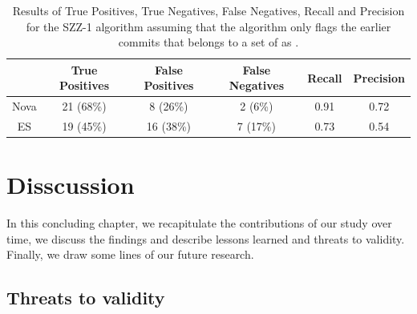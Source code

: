 \documentclass[a4paper, 12pt]{book}
\begin{document}
\begin{table}[!t]
	\renewcommand{\arraystretch}{1.3}
	\caption{Results of True Positives, True Negatives, False Negatives, Recall and Precision for the SZZ-1 algorithm assuming that the algorithm only flags the earlier commits that belongs to a set of  as \BIC.}
	\label{realSZZ2}
	\centering
	\begin{tabular}{|c|c|c|c|c|c|}
		\hline
 	 	&  True Positives & False Positives & False Negatives & Recall & Precision \\
		\hline
		\hline
		Nova & 21 (68\%) & 8 (26\%) & 2 (6\%) & 0.91 & 0.72\\
		\hline
		ES &  19 (45\%) & 16 (38\%) & 7 (17\%)& 0.73 & 0.54 \\
		\hline
	\end{tabular}
\end{table}



\vspace{0.2cm}
\vspace{0.1cm}



\cleardoublepage
\chapter{Disscussion}
\label{chap:discussion}
In this concluding chapter, we recapitulate the contributions of our study over time, we discuss the findings and describe lessons learned and threats to validity. Finally, we draw some lines of our future research.

\section{Threats to validity}
\label{sec:threats}
\end{document}
